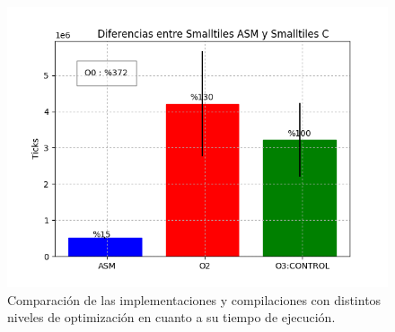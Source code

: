 \begin{figure}[h!]
\centering
\captionsetup{justification=centering}
\includegraphics[width = 12 cm, height = 7 cm]{imagenes/ASMvsCSmalltiles.png}
\caption[center]{Comparación de las implementaciones y compilaciones con distintos niveles de optimización en cuanto a su tiempo de ejecución.}
\end{figure}
